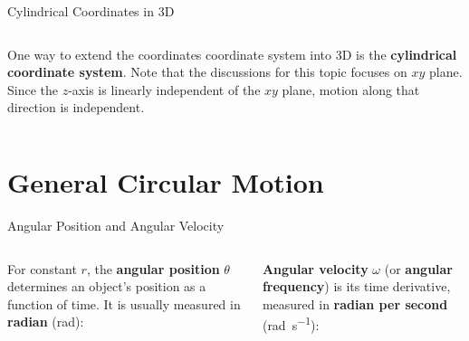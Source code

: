 \documentclass[12pt,compress,aspectratio=169]{beamer}
\begin{document}
\begin{frame}{Cylindrical Coordinates in 3D}
  \begin{columns}

    One way to extend the coordinates coordinate system into 3D is the
    \textbf{cylindrical coordinate system}. Note that the discussions for this
    topic focuses on $xy$ plane. Since the $z$-axis is linearly independent of
    the $xy$ plane, motion along that direction is independent.
  \end{columns}
\end{frame}



\section{General Circular Motion}

\begin{frame}{Angular Position and Angular Velocity}
  \vspace{.2in}
  \begin{columns}[T]
    
    For constant $r$, the \textbf{angular position} $\theta$ determines an
    object's position as a function of time. It is usually measured in
    \textbf{radian} (\si{\radian}):

    
    \vspace{-.1in}\textbf{Angular velocity} $\omega$ (or \textbf{angular
      frequency}) is its time derivative, measured in \textbf{radian per second}
    (\si{\radian\per\second}):
      
  \end{columns}
\end{frame}
\end{document}
